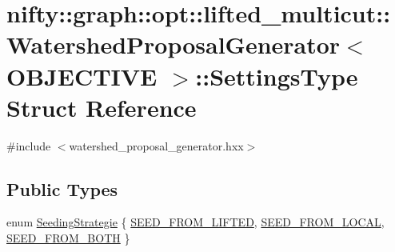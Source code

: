 \hypertarget{structnifty_1_1graph_1_1opt_1_1lifted__multicut_1_1WatershedProposalGenerator_1_1SettingsType}{}\section{nifty\+:\+:graph\+:\+:opt\+:\+:lifted\+\_\+multicut\+:\+:Watershed\+Proposal\+Generator$<$ O\+B\+J\+E\+C\+T\+I\+VE $>$\+:\+:Settings\+Type Struct Reference}
\label{structnifty_1_1graph_1_1opt_1_1lifted__multicut_1_1WatershedProposalGenerator_1_1SettingsType}


{\ttfamily \#include $<$watershed\+\_\+proposal\+\_\+generator.\+hxx$>$}

\subsection*{Public Types}
\begin{DoxyCompactItemize}
\item 
enum \hyperlink{structnifty_1_1graph_1_1opt_1_1lifted__multicut_1_1WatershedProposalGenerator_1_1SettingsType_adb1dc7c5efbaf2442345aaa665aa2027}{Seeding\+Strategie} \{ \hyperlink{structnifty_1_1graph_1_1opt_1_1lifted__multicut_1_1WatershedProposalGenerator_1_1SettingsType_adb1dc7c5efbaf2442345aaa665aa2027a7282202a01543dc6167933813f619626}{S\+E\+E\+D\+\_\+\+F\+R\+O\+M\+\_\+\+L\+I\+F\+T\+ED}, 
\hyperlink{structnifty_1_1graph_1_1opt_1_1lifted__multicut_1_1WatershedProposalGenerator_1_1SettingsType_adb1dc7c5efbaf2442345aaa665aa2027ae5ca5e78c1133acb8e67e728f8b90644}{S\+E\+E\+D\+\_\+\+F\+R\+O\+M\+\_\+\+L\+O\+C\+AL}, 
\hyperlink{structnifty_1_1graph_1_1opt_1_1lifted__multicut_1_1WatershedProposalGenerator_1_1SettingsType_adb1dc7c5efbaf2442345aaa665aa2027a431526b0114ce2893c003f9cf9e3356a}{S\+E\+E\+D\+\_\+\+F\+R\+O\+M\+\_\+\+B\+O\+TH}
 \}
\end{DoxyCompactItemize}
